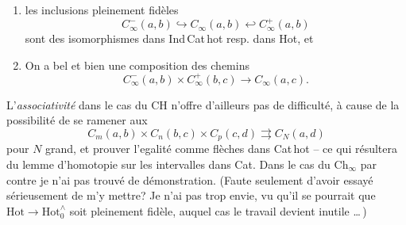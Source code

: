 \documentclass[11pt]{article}
\newcommand{\HotO}{\mathrm{Hot}_0^{\wedge}}
\begin{document}
\begin{enumerate}
\item[a)] les inclusions pleinement fidèles
\[
C^{-}_{\infty}(a,b)\hookrightarrow C_{\infty}(a,b)\hookleftarrow C^{+}_{\infty}(a,b)
\]
sont des isomorphismes dans Ind\,Cat\,hot resp. dans Hot, et
\item[b)] On a bel et bien une composition des chemins
\[
C^{-}_{\infty}(a,b)\times C^{+}_{\infty}(b,c)\longrightarrow C_{\infty}(a,c).
\]
\end{enumerate}

L'\textit{associativité} dans le cas du CH n'offre d'ailleurs pas de difficulté, à cause de la possibilité de se ramener aux
\[
C_m(a,b)\times C_n(b,c)\times C_p(c,d)\rightrightarrows C_N(a,d)
\]
pour $N$ grand, et prouver l'egalité comme flèches dans Cat\,hot -- ce qui résultera du lemme %
d'homotopie sur les intervalles dans Cat. Dans le cas du $\mathrm{Ch}_{\infty}$ par contre je n'ai pas trouvé de démonstration. (Faute seulement d'avoir essayé sérieusement de m'y mettre? Je n'ai pas trop envie, vu qu'il se pourrait que $\mathrm{Hot}\longrightarrow\HotO$ soit pleinement fidèle, auquel cas le travail devient inutile \dots\,)
\end{document}
